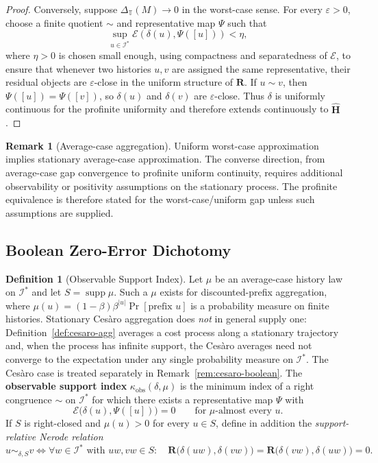 \documentclass[12pt]{article}
\theoremstyle{definition}
\newtheorem{definition}[theorem]{Definition}
\newtheorem{remark}[theorem]{Remark}
\begin{document}
\begin{proof}
Conversely, suppose $\Delta_{\mathbb T}(M)\to0$ in the worst-case sense.  For
every $\varepsilon>0$, choose a finite quotient $\sim$ and representative map
$\Psi$ such that
\[
\sup_{u\in\mathcal I^*}
\mathcal E(\delta(u),\Psi([u]))
<
\eta,
\]
where $\eta>0$ is chosen small enough, using compactness and separatedness of
$\mathcal E$, to ensure that whenever two histories $u,v$ are assigned the same
representative, their residual objects are $\varepsilon$-close in the uniform
structure of $\mathbf R$.  If $u\sim v$, then $\Psi([u])=\Psi([v])$, so
$\delta(u)$ and $\delta(v)$ are $\varepsilon$-close.  Thus $\delta$ is
uniformly continuous for the profinite uniformity and therefore extends
continuously to $\widehat{\mathbf H}$.
\end{proof}

\begin{remark}[Average-case aggregation]
\label{rem:average-profinite}
Uniform worst-case approximation implies stationary average-case
approximation.  The converse direction, from average-case gap convergence to
profinite uniform continuity, requires additional observability or positivity
assumptions on the stationary process.  The profinite equivalence is therefore
stated for the worst-case/uniform gap unless such assumptions are supplied.
\end{remark}

\subsection{Boolean Zero-Error Dichotomy}
\label{subsec:meta-boolean}

\begin{definition}[Observable Support Index]
\label{def:observable-support-index}
Let $\mu$ be an average-case history law on $\mathcal I^*$ and let
$S=\operatorname{supp}\mu$.  Such a $\mu$ exists for discounted-prefix
aggregation, where
$\mu(u)=(1-\beta)\beta^{|u|}\Pr[\text{prefix }u]$ is a probability measure on
finite histories.  Stationary Ces\`aro aggregation does \emph{not} in general
supply one: Definition~\ref{def:cesaro-agg} averages a cost process along a
stationary trajectory and, when the process has infinite support, the Ces\`aro
averages need not converge to the expectation under any single probability
measure on $\mathcal I^*$.  The Ces\`aro case is treated separately in
Remark~\ref{rem:cesaro-boolean}.
The \textbf{observable support index} $\kappa_{\mathrm{obs}}(\delta,\mu)$ is
the minimum index of a right congruence $\sim$ on $\mathcal I^*$ for which
there exists a representative map $\Psi$ with
\[
\mathcal E\bigl(\delta(u),\Psi([u])\bigr)=0
\qquad
\text{for }\mu\text{-almost every }u .
\]
If $S$ is right-closed and $\mu(u)>0$ for every $u\in S$, define in addition
the \emph{support-relative Nerode relation}
\[
u\sim_{\delta,S}v
\iff
\forall w\in\mathcal I^*\text{ with }uw,vw\in S:\quad
\mathbf R\bigl(\delta(uw),\delta(vw)\bigr)
=
\mathbf R\bigl(\delta(vw),\delta(uw)\bigr)
=
0 .
\]
\end{definition}
\end{document}
